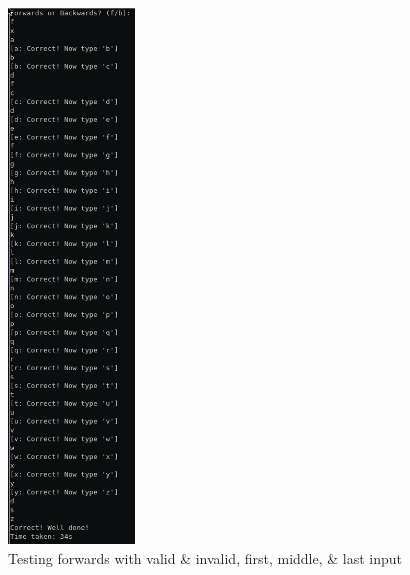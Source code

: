 \documentclass[11pt]{article}
\begin{document}
\begin{center}
\begin{figure}[htp]
    \centering
    \includegraphics[width=0.3\textwidth]{forwards.png}
    \caption{Testing forwards with valid \& invalid, first, middle, \& last input}
\end{figure}
\end{center}
\end{document}
